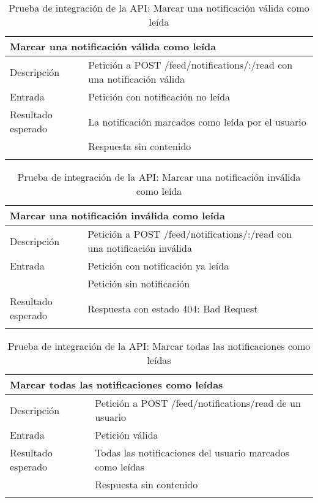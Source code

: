 \begin{longtable}{|p{} p{}|}
    \hline
    \multicolumn{2}{|l|}{\textbf{Marcar una notificación válida como leída}} \\ \hline 
    Descripción                 & Petición a POST /feed/notifications/:/read con una notificación válida \\ \hline
    Entrada                     & Petición con notificación no leída \\ \hline
    Resultado esperado          & La notificación marcados como leída por el usuario \\
                                & Respuesta sin contenido \\ \hline
    \caption{Prueba de integración de la API: Marcar una notificación válida como leída}
    \label{cp:i:api:marcar_notificacion_valida_leida}
\end{longtable}
\begin{longtable}{|p{} p{}|}
    \hline
    \multicolumn{2}{|l|}{\textbf{Marcar una notificación inválida como leída}} \\ \hline 
    Descripción                 & Petición a POST /feed/notifications/:/read con una notificación inválida \\ \hline
    Entrada                     & Petición con notificación ya leída \\
                                & Petición sin notificación \\ \hline
    Resultado esperado          & Respuesta con estado 404: Bad Request \\ \hline
    \caption{Prueba de integración de la API: Marcar una notificación inválida como leída}
    \label{cp:i:api:marcar_notificacion_invalida_leida}
\end{longtable}

\begin{longtable}{|p{} p{}|}
    \hline
    \multicolumn{2}{|l|}{\textbf{Marcar todas las notificaciones como leídas}} \\ \hline 
    Descripción                 & Petición a POST /feed/notifications/read de un usuario \\ \hline
    Entrada                     & Petición válida \\ \hline
    Resultado esperado          & Todas las notificaciones del usuario marcados como leídas \\
                                & Respuesta sin contenido \\ \hline
    \caption{Prueba de integración de la API: Marcar todas las notificaciones como leídas}
    \label{cp:i:api:marcar_notificaciones_leidas}
\end{longtable}

